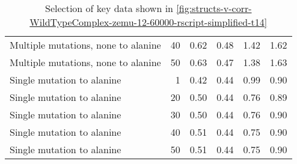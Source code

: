 \begin{table}
\begin{tabular}{lrrrrr}
 Multiple mutations, none to alanine &          40 &          0.62 &                    0.48 &            1.42 &                      1.62 \\
 Multiple mutations, none to alanine &          50 &          0.63 &                    0.47 &            1.38 &                      1.63 \\
          Single mutation to alanine &           1 &          0.42 &                    0.44 &            0.99 &                      0.90 \\
          Single mutation to alanine &          20 &          0.50 &                    0.44 &            0.76 &                      0.89 \\
          Single mutation to alanine &          30 &          0.50 &                    0.44 &            0.76 &                      0.90 \\
          Single mutation to alanine &          40 &          0.51 &                    0.44 &            0.75 &                      0.90 \\
          Single mutation to alanine &          50 &          0.51 &                    0.44 &            0.75 &                      0.90 \\
\bottomrule
\end{tabular}

\caption[]{Selection of key data shown in \cref{fig:structs-v-corr-WildTypeComplex-zemu-12-60000-rscript-simplified-t14}}
\label{tab:structs-v-corr-WildTypeComplex-zemu-12-60000-rscript-simplified-t14-underlying-data}
\end{table}
